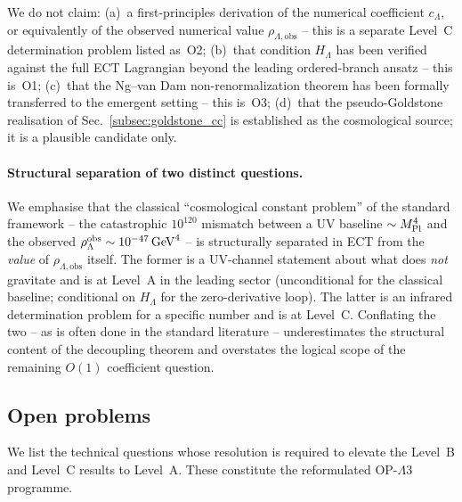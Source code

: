 We do not claim: (a)~a first-principles derivation of the numerical
coefficient $c_\Lambda$, or equivalently of the observed numerical
value $\rho_{\Lambda,\mathrm{obs}}$ -- this is a separate Level~C
determination problem listed as~O2;
(b)~that condition $H_\Lambda$ has been verified against the full ECT
Lagrangian beyond the leading ordered-branch ansatz -- this is~O1;
(c)~that the Ng--van Dam non-renormalization theorem has been
formally transferred to the emergent setting -- this is~O3;
(d)~that the pseudo-Goldstone realisation of
Sec.~\ref{subsec:goldstone_cc} is established as the cosmological
source; it is a plausible candidate only.

\paragraph{Structural separation of two distinct questions.}
We emphasise that the classical ``cosmological constant problem'' of
the standard framework -- the catastrophic $10^{120}$ mismatch
between a UV baseline $\sim M_{\rm Pl}^4$ and the observed
$\rho_\Lambda^{\rm obs}\sim 10^{-47}\,\mathrm{GeV}^4$ -- is
structurally separated in ECT from the \emph{value} of
$\rho_{\Lambda,\mathrm{obs}}$ itself. The former is a UV-channel
statement about what does \emph{not} gravitate and is at Level~A in
the leading sector (unconditional for the classical baseline;
conditional on $H_\Lambda$ for the zero-derivative loop). The latter is an
infrared determination problem for a specific number and is at
Level~C. Conflating the two -- as is often done in the standard
literature -- underestimates the structural content of the
decoupling theorem and overstates the logical scope of the
remaining $O(1)$ coefficient question.


\subsection{Open problems}
\label{subsec:cc_open}

We list the technical questions whose resolution is required to
elevate the Level~B and Level~C results to Level~A. These constitute
the reformulated OP-$\Lambda$3 programme.

